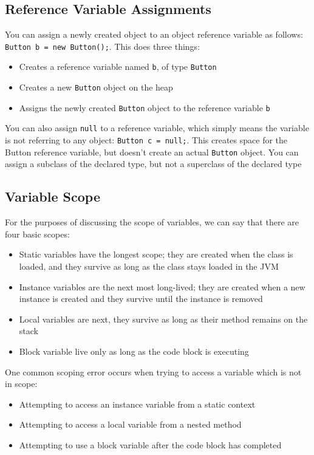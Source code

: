 \subsection{Reference Variable Assignments}
You can assign a newly created object to an object reference variable as 
follows: \verb#Button b = new Button();#. This does three things:
\begin{itemize}
    \item Creates a reference variable named \verb#b#, of type \verb#Button#
    \item Creates a new \verb#Button# object on the heap
    \item Assigns the newly created \verb#Button# object to the reference 
    variable \verb#b#
\end{itemize}
You can also assign \verb#null# to a reference variable, which simply means the 
variable is not referring to any object: \verb#Button c = null;#. This creates 
space for the Button reference variable, but doesn't create an actual 
\verb#Button# object. You can assign a subclass of the declared type, but not a 
superclass of the declared type

\subsection{Variable Scope}
For the purposes of discussing the scope of variables, we can say that there 
are four basic scopes:
\begin{itemize}
    \item Static variables have the longest scope; they are created when the 
    class is loaded, and they survive as long as the class stays loaded in the 
    JVM
    \item Instance variables are the next most long-lived; they are created 
    when a new instance is created and they survive until the instance is 
    removed
    \item Local variables are next, they survive as long as their method 
    remains on the stack
    \item Block variable live only as long as the code block is executing
\end{itemize}
One common scoping error occurs when trying to access a variable which is not 
in scope:
\begin{itemize}
    \item Attempting to access an instance variable from a static context
    \item Attempting to access a local variable from a nested method
    \item Attempting to use a block variable after the code block has completed
\end{itemize}

